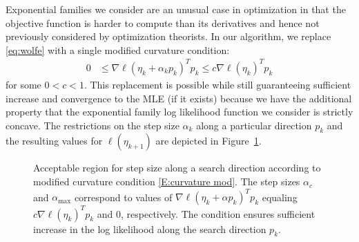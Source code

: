 Exponential families we consider are an unusual case in optimization in that the 
objective function 
is harder to compute than its derivatives and hence not previously considered by 
optimization theorists.
In our algorithm, we replace \eqref{eq:wolfe} with a single modified curvature 
condition:
\begin{align} \label{E:curvature mod}
	 0 & \leq \nabla \ell( \eta_k + \alpha_k p_k)^T p_k \leq c \nabla \ell(\eta_k)^T p_k
\end{align}
for some $0 < c < 1$.  This replacement is possible while still guaranteeing 
sufficient increase and convergence to the MLE (if it exists) 
because we have the additional property that the exponential family log likelihood 
function we consider is strictly 
concave.  The restrictions on the step size $\alpha_k$ along a particular direction 
$p_k$ and the resulting values for 
$\ell(\eta_{k+1})$ are depicted in Figure~\ref{F:alpha_region}.  

\begin{figure}[h]
\centering
    \scalebox{.4}{}
	\caption[Acceptable region for step size along a search 
direction according to modified curvature condition]{Acceptable region for step size 
along a search direction according to modified curvature condition 
\eqref{E:curvature mod}. The step sizes $\alpha_{c}$ and $\alpha_{\textrm{max}}$ 
correspond to values of $\nabla \ell( \eta_k + \alpha p_k)^T p_k$ equaling 
$c \nabla \ell(\eta_k)^T p_k$ and $0$, 
respectively.  The condition ensures sufficient increase in the log likelihood along 
the search direction $p_k$.}
\label{F:alpha_region}
\end{figure}
 



